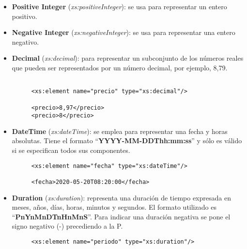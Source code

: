 \begin{itemize}
    \item \textbf{Positive Integer} (\textit{xs:positiveInteger}): se usa para representar un entero positivo.
    \item \textbf{Negative Integer} (\textit{xs:negativeInteger}): se usa para representar una entero negativo.
    \item \textbf{Decimal} (\textit{xs:decimal}): para representar un subconjunto de los números reales que pueden ser representados por un número decimal, por ejemplo, 8,79.


    \begin{figure}[H]
        \begin{tcolorbox}[sharp corners, colback=yellow!30, colframe=white!20]
            \scriptsize
            \begin{verbatim}

<xs:element name="precio" type="xs:decimal"/>

<precio>8,97</precio>
<precio>8</precio>
            \end{verbatim}
        \end{tcolorbox}
    \end{figure}

    \item \textbf{DateTime} (\textit{xs:dateTime}): se emplea para representar una fecha y horas absolutas. Tiene el formato ``\textbf{YYYY-MM-DDThh:mm:ss}'' y sólo es válido si se especifican todos sus componentes.

    \begin{figure}[h]
        \begin{tcolorbox}[sharp corners, colback=yellow!30, colframe=white!20]
            \scriptsize
            \begin{verbatim}
<xs:element name="fecha" type="xs:dateTime"/>

<fecha>2020-05-20T08:20:00</fecha>
            \end{verbatim}
        \end{tcolorbox}
    \end{figure}
    \item \textbf{Duration} (\textit{xs:duration}): representa una duración de tiempo expresada en meses, años, días, horas, minutos y segundos. El formato utilizado es ``\textbf{PnYnMnDTnHnMnS}''. Para indicar una duración negativa se pone el signo negativo (-) precediendo a la P.

    \begin{figure}[h]
        \begin{tcolorbox}[sharp corners, colback=yellow!30, colframe=white!20]
            \scriptsize
            \begin{verbatim}
<xs:element name="periodo" type="xs:duration"/>


\end{verbatim}
\end{tcolorbox}
\end{figure}
\end{itemize}
